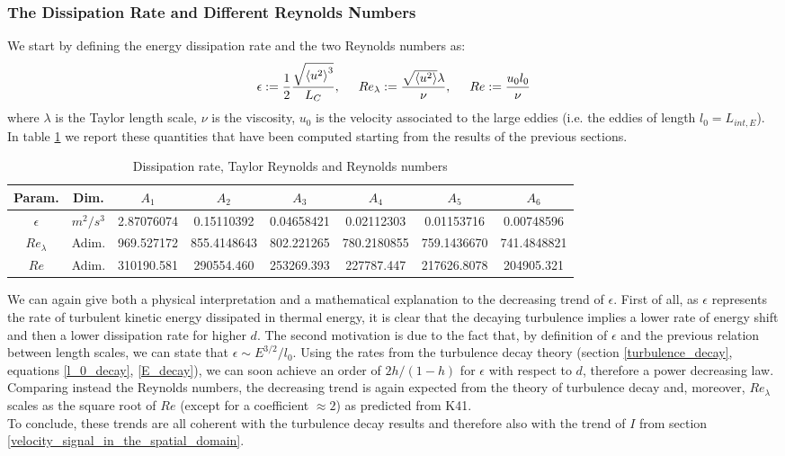 \documentclass[11pt,titlepage]{article}
\begin{document}
\subsubsection{The Dissipation Rate and Different Reynolds Numbers} \label{the_dissipation_rate_and}
We start by defining the energy dissipation rate and the two Reynolds numbers as:
\begin{equation*}
	\epsilon:=\frac{1}{2} \frac{\sqrt{\left< u^2 \right >^3}}{L_C}, \hspace{5mm} Re_{\lambda} := \frac{\sqrt{\left < u^2\right > } \lambda}{\nu}, \hspace{5mm} Re := \frac{u_0 l_0}{\nu}
\end{equation*}
where $\lambda$ is the Taylor length scale, $\nu$ is the viscosity, $u_0$ is the velocity associated to the large eddies (i.e. the eddies of length $l_0=L_{int,E}$).
In table \ref{tab4} we report these quantities that have been computed starting from the results of the previous sections. \\

\begin{table}[h!]
\centering
\caption{Dissipation rate, Taylor Reynolds and Reynolds numbers} \label{tab4}
    \begin{tabular}{ | c | c | c | c | c | c | c | c |}
        \hline
        Param. & Dim. & $A_1$ & $A_2$ & $A_3$ & $A_4$ & $A_5$ & $A_6$ \\
        \hline
        $\epsilon$ & $m^2/s^3$&2.87076074& 0.15110392& 0.04658421& 0.02112303& 0.01153716 &0.00748596  \\
        \hline
        $Re_\lambda$ & Adim. & 969.527172 & 855.4148643& 802.221265 & 780.2180855& 759.1436670&
        741.4848821 \\
        \hline
        $Re$& Adim. &310190.581 & 290554.460& 253269.393 &227787.447&
        217626.8078 &204905.321 \\
        \hline
    \end{tabular}
\end{table}
We can again give both a physical interpretation and a mathematical explanation to the decreasing trend of $\epsilon$. First of all, as $\epsilon$ represents the rate of turbulent kinetic energy dissipated in thermal energy, it is clear that the decaying turbulence implies a lower rate of energy shift and then a lower dissipation rate for higher $d$. The second motivation is due to the fact that, by definition of $\epsilon$ and the previous relation between length scales, we can state that $\epsilon \sim E^{3/2}/l_0$. Using the rates from the turbulence decay theory (section \ref{turbulence_decay}, equations \ref{l_0_decay}, \ref{E_decay}), we can soon achieve an order of $2h/(1-h)$ for $\epsilon$ with respect to $d$, therefore a power decreasing law. \\
Comparing instead the Reynolds numbers, the decreasing trend is again expected from the theory of turbulence decay and, moreover, $Re_{\lambda}$ scales as the square root of $Re$ (except for a coefficient $\approx 2$) as predicted from K41. \\
To conclude, these trends are all coherent with the turbulence decay results and therefore also with the trend of $I$ from section \ref{velocity_signal_in_the_spatial_domain}.
\end{document}
